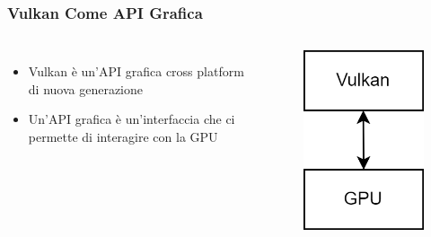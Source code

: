 \begin{frame}
\frametitle{Vulkan Come API Grafica}
\begin{columns}


\begin{itemize}
\item Vulkan è un'API grafica cross platform di nuova generazione
\item Un'API grafica è un'interfaccia che ci permette di interagire con la GPU
\end{itemize}


\begin{figure}[ht]
    \centering
    \includegraphics[scale=0.2]{images/SlidesVulkan/VulkanAPI.png}
\end{figure}

\end{columns}
\end{frame}
